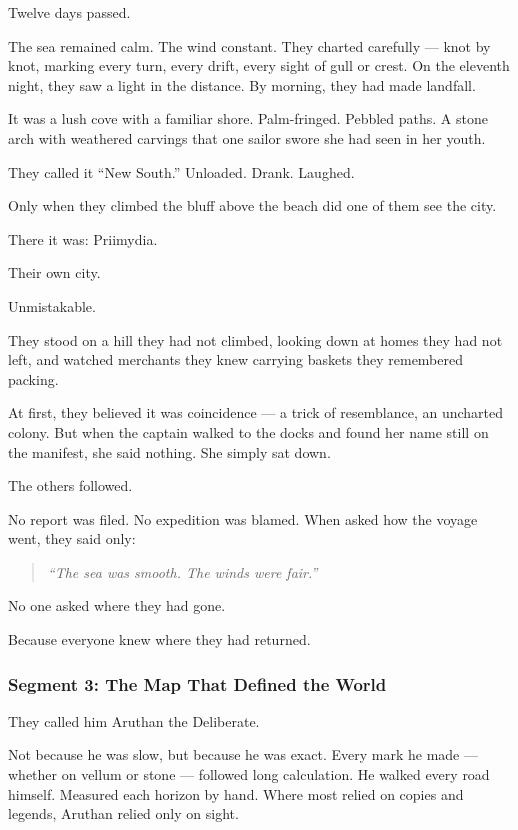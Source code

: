 \documentclass[9pt]{article}
\begin{document}
Twelve days passed.

The sea remained calm. The wind constant. They charted carefully — knot by knot, marking every turn, every drift, every sight of gull or crest. On the eleventh night, they saw a light in the distance. By morning, they had made landfall.

It was a lush cove with a familiar shore. Palm-fringed. Pebbled paths. A stone arch with weathered carvings that one sailor swore she had seen in her youth.

They called it ``New South.'' Unloaded. Drank. Laughed.

Only when they climbed the bluff above the beach did one of them see the city.

There it was: Priimydia.

Their own city.

Unmistakable.

They stood on a hill they had not climbed, looking down at homes they had not left, and watched merchants they knew carrying baskets they remembered packing.

At first, they believed it was coincidence — a trick of resemblance, an uncharted colony. But when the captain walked to the docks and found her name still on the manifest, she said nothing. She simply sat down.

The others followed.

No report was filed. No expedition was blamed. When asked how the voyage went, they said only:

\begin{quote}
\emph{``The sea was smooth. The winds were fair.''}
\end{quote}

No one asked where they had gone.

Because everyone knew where they had returned.

\newpage

\subsubsection*{Segment 3: The Map That Defined the World}

They called him Aruthan the Deliberate.

Not because he was slow, but because he was exact. Every mark he made — whether on vellum or stone — followed long calculation. He walked every road himself. Measured each horizon by hand. Where most relied on copies and legends, Aruthan relied only on sight.
\end{document}
